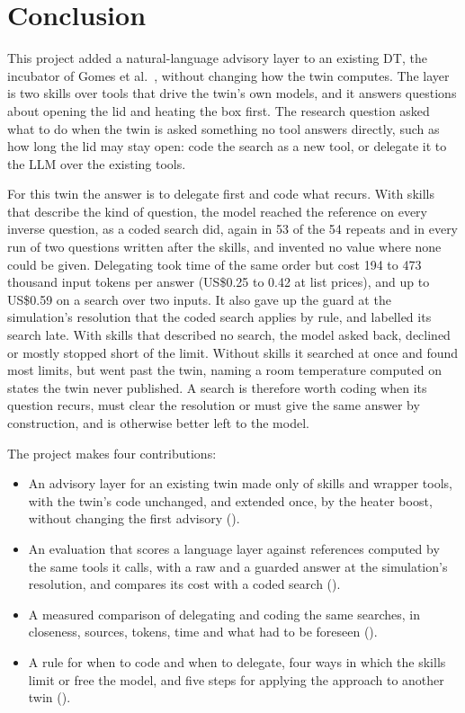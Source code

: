   \section{Conclusion}
  \label{sec:conclusion}

  This project added a natural-language advisory layer to an existing DT, the incubator
  of Gomes et al.\ \cite{gomes2025incubator}, without changing how the twin computes. The layer is
  two skills over tools that drive the twin's own models, and it answers questions about opening
  the lid and heating the box first. The research question asked what to do when the twin is asked
  something no tool answers directly, such as how long the lid may stay open: code the search as a
  new tool, or delegate it to the LLM over the existing tools.

  For this twin the answer is to delegate first and code what recurs. With skills that describe the
  kind of question, the model reached the reference on every inverse question, as a coded search
  did, again in 53 of the 54 repeats and in every run of two questions written after
  the skills, and invented no value where none could be given.
  Delegating took time of the same order but cost 194 to 473 thousand input tokens per answer
  (US\$0.25 to 0.42 at list prices), and up to US\$0.59 on a search over two inputs. It also gave
  up the guard at the simulation's resolution that the coded search applies by rule, and labelled
  its search late. With skills that described no
  search, the model asked back, declined or mostly stopped short of the limit. Without skills it
  searched at once and found most limits, but went past the twin, naming a room
  temperature computed on states the twin never published. A search is therefore worth coding when its question
  recurs, must clear the resolution or must give the same answer by construction, and is otherwise
  better left to the model.

  The project makes four contributions:

  \begin{itemize}
    \item An advisory layer for an existing twin made only of skills and wrapper tools, with the
      twin's code unchanged, and extended once, by the heater boost, without changing the first
      advisory ().
    \item An evaluation that scores a language layer against references computed by the same tools
      it calls, with a raw and a guarded answer at the simulation's resolution, and compares
      its cost with a coded search ().
    \item A measured comparison of delegating and coding the same searches, in closeness, sources,
      tokens, time and what had to be foreseen ().
    \item A rule for when to code and when to delegate, four ways in which the skills limit or free
      the model, and five steps for applying the approach to another twin
      ().
  \end{itemize}

